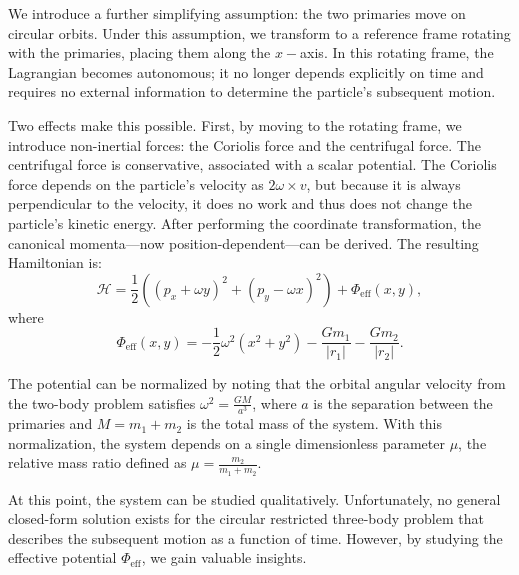         We introduce a further simplifying assumption: the two primaries move on circular orbits. Under this assumption, we transform to a reference frame rotating with the primaries, placing them along the $x-$axis. In this rotating frame, the Lagrangian becomes autonomous; it no longer depends explicitly on time and requires no external information to determine the particle's subsequent motion.

        Two effects make this possible. First, by moving to the rotating frame, we introduce non-inertial forces: the Coriolis force and the centrifugal force. The centrifugal force is conservative, associated with a scalar potential. The Coriolis force depends on the particle's velocity as $2\omega\times v$, but because it is always perpendicular to the velocity, it does no work and thus does not change the particle's kinetic energy. After performing the coordinate transformation, the canonical momenta—now position-dependent—can be derived. The resulting Hamiltonian is:
        \begin{equation}
            \mathcal{H} = \frac{1}{2}\left(\left(p_x + \omega y\right)^2 + \left(p_y - \omega x\right)^2 \right) + \Phi_\mathrm{eff}(x,y),
        \end{equation}
        where
        \begin{equation}
            \Phi_\mathrm{eff}(x,y) = -\frac{1}{2} \omega^2 (x^2 + y^2) - \frac{G m_1}{|r_1|} - \frac{G m_2}{|r_2|}.
        \end{equation}

        The potential can be normalized by noting that the orbital angular velocity from the two-body problem satisfies \(\omega^2 = \frac{G M}{a^3}\), where \(a\) is the separation between the primaries and \(M = m_1 + m_2\) is the total mass of the system. With this normalization, the system depends on a single dimensionless parameter \(\mu\), the relative mass ratio defined as \(\mu = \frac{m_2}{m_1 + m_2}\).

        At this point, the system can be studied qualitatively. Unfortunately, no general closed-form solution exists for the circular restricted three-body problem that describes the subsequent motion as a function of time. However, by studying the effective potential \(\Phi_\mathrm{eff}\), we gain valuable insights.

